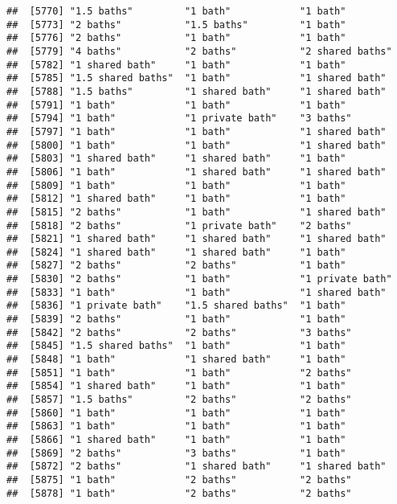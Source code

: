 \documentclass[
]{article}
\begin{document}
\begin{verbatim}
##  [5770] "1.5 baths"         "1 bath"            "1 bath"           
##  [5773] "2 baths"           "1.5 baths"         "1 bath"           
##  [5776] "2 baths"           "1 bath"            "1 bath"           
##  [5779] "4 baths"           "2 baths"           "2 shared baths"   
##  [5782] "1 shared bath"     "1 bath"            "1 bath"           
##  [5785] "1.5 shared baths"  "1 bath"            "1 shared bath"    
##  [5788] "1.5 baths"         "1 shared bath"     "1 shared bath"    
##  [5791] "1 bath"            "1 bath"            "1 bath"           
##  [5794] "1 bath"            "1 private bath"    "3 baths"          
##  [5797] "1 bath"            "1 bath"            "1 shared bath"    
##  [5800] "1 bath"            "1 bath"            "1 shared bath"    
##  [5803] "1 shared bath"     "1 shared bath"     "1 bath"           
##  [5806] "1 bath"            "1 shared bath"     "1 shared bath"    
##  [5809] "1 bath"            "1 bath"            "1 bath"           
##  [5812] "1 shared bath"     "1 bath"            "1 bath"           
##  [5815] "2 baths"           "1 bath"            "1 shared bath"    
##  [5818] "2 baths"           "1 private bath"    "2 baths"          
##  [5821] "1 shared bath"     "1 shared bath"     "1 shared bath"    
##  [5824] "1 shared bath"     "1 shared bath"     "1 bath"           
##  [5827] "2 baths"           "2 baths"           "1 bath"           
##  [5830] "2 baths"           "1 bath"            "1 private bath"   
##  [5833] "1 bath"            "1 bath"            "1 shared bath"    
##  [5836] "1 private bath"    "1.5 shared baths"  "1 bath"           
##  [5839] "2 baths"           "1 bath"            "1 bath"           
##  [5842] "2 baths"           "2 baths"           "3 baths"          
##  [5845] "1.5 shared baths"  "1 bath"            "1 bath"           
##  [5848] "1 bath"            "1 shared bath"     "1 bath"           
##  [5851] "1 bath"            "1 bath"            "2 baths"          
##  [5854] "1 shared bath"     "1 bath"            "1 bath"           
##  [5857] "1.5 baths"         "2 baths"           "2 baths"          
##  [5860] "1 bath"            "1 bath"            "1 bath"           
##  [5863] "1 bath"            "1 bath"            "1 bath"           
##  [5866] "1 shared bath"     "1 bath"            "1 bath"           
##  [5869] "2 baths"           "3 baths"           "1 bath"           
##  [5872] "2 baths"           "1 shared bath"     "1 shared bath"    
##  [5875] "1 bath"            "2 baths"           "2 baths"          
##  [5878] "1 bath"            "2 baths"           "2 baths"          

\end{verbatim}
\end{document}
